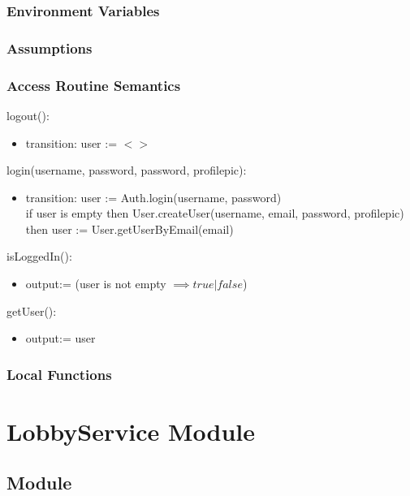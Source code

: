 \documentclass[12pt, titlepage]{article}
\begin{document}
\subsubsection{Environment Variables}

\subsubsection{Assumptions}

\subsubsection{Access Routine Semantics}

\noindent logout():
\begin{itemize}
\item transition: user := $<>$\\
\end{itemize}

\noindent login(username, password, password, profilepic):
\begin{itemize}
\item transition: user := Auth.login(username, password)\\
if user is empty then User.createUser(username, email, password, profilepic) then user := User.getUserByEmail(email)
\end{itemize}

\noindent isLoggedIn():
\begin{itemize} 
\item output:= (user is not empty $\implies true | false$)
\end{itemize}

\noindent getUser():
\begin{itemize}
\item output:= user
\end{itemize}

\subsubsection{Local Functions}

\newpage


\section{LobbyService Module} \label{LobbyService} 

\subsection{Module}
\end{document}
